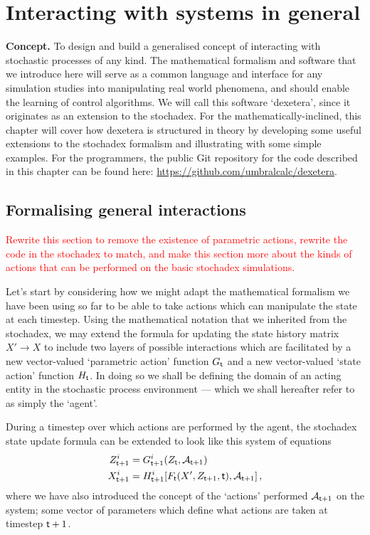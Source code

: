 \chapter{\sffamily Interacting with systems in general}

{\bfseries\sffamily Concept.} To design and build a generalised concept of interacting with stochastic processes of any kind. The mathematical formalism and software that we introduce here will serve as a common language and interface for any simulation studies into manipulating real world phenomena, and should enable the learning of control algorithms. We will call this software `dexetera', since it originates as an extension to the stochadex. For the mathematically-inclined, this chapter will cover how dexetera is structured in theory by developing some useful extensions to the stochadex formalism and illustrating with some simple examples. For the programmers, the public Git repository for the code described in this chapter can be found here: \href{https://github.com/umbralcalc/dexetera}{https://github.com/umbralcalc/dexetera}.

\section{\sffamily Formalising general interactions}

\textcolor{red}{Rewrite this section to remove the existence of parametric actions, rewrite the code in the stochadex to match, and make this section more about the kinds of actions that can be performed on the basic stochadex simulations.}

Let's start by considering how we might adapt the mathematical formalism we have been using so far to be able to take actions which can manipulate the state at each timestep. Using the mathematical notation that we inherited from the stochadex, we may extend the formula for updating the state history matrix $X'\rightarrow X$ to include two layers of possible interactions which are facilitated by a new vector-valued `parametric action' function $G_{{\sf t}}$ and a new vector-valued `state action' function $H_{{\sf t}}$. In doing so we shall be defining the domain of an acting entity in the stochastic process environment --- which we shall hereafter refer to as simply the `agent'.

During a timestep over which actions are performed by the agent, the stochadex state update formula can be extended to look like this system of equations
\begin{align}
Z_{{\sf t}+1}^i &= G_{{\sf t}+1}^i(Z_{{\sf t}}, {\cal A}_{{\sf t}+1}) \label{eq:generalised-param-actions} \\
X_{{\sf t}+1}^i &= H^i_{{\sf t}+1}[F_{\sf t}(X', Z_{{\sf t}+1}, {\sf t}), {\cal A}_{{\sf t}+1}] \label{eq:generalised-state-actions} \,,
\end{align}
where we have also introduced the concept of the `actions' performed ${\cal A}_{{\sf t}+1}$ on the system; some vector of parameters which define what actions are taken at timestep ${\sf t}+1$.

